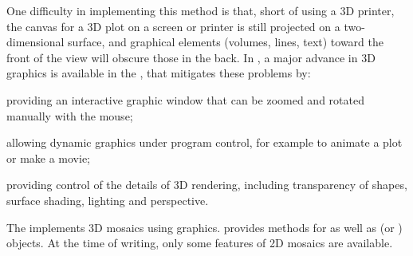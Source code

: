 \documentclass[10pt,krantz2]{krantz}\usepackage[]{graphicx}\usepackage[]{color}
\begin{document}
One difficulty in implementing this method is that, short of using a 3D printer,
the canvas for a 3D plot on a screen or printer is still projected
on a two-dimensional surface, and graphical elements (volumes, lines, text)
toward the front of the view will obscure those in the back.
In \R, a major advance in 3D graphics is available in the ,
that mitigates these problems by:
\begin{seriate}
 \item providing an interactive graphic window that can be zoomed and rotated
 manually with the mouse;
 \item allowing dynamic graphics under program control, for example to animate
 a plot or make a movie;
 \item providing control of the details of 3D rendering, including transparency
 of shapes, surface shading, lighting and perspective.
\end{seriate}

The  implements 3D mosaics using  graphics.
 provides methods for 
as well as  (or ) objects.
At the time of writing, only some features of 2D mosaics are available.
\end{document}
